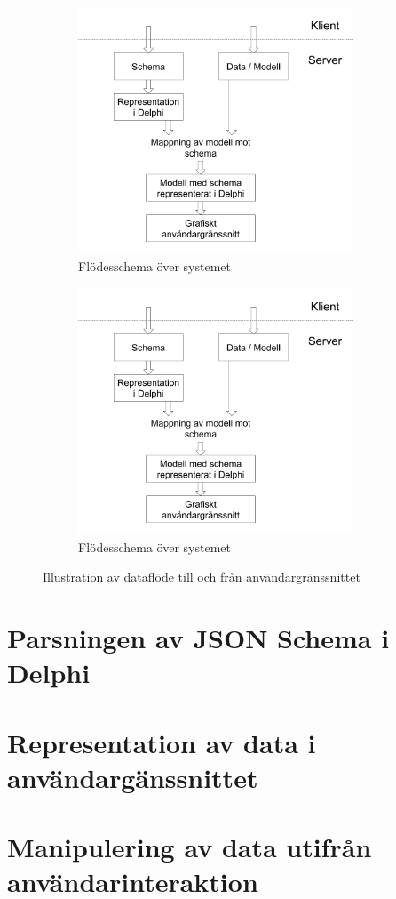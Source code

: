 \begin{figure}
	\begin{subfigure}[b]{0.5\textwidth}
		\includegraphics[width=0.9\textwidth,left]{./img.png}
		\caption{Flödesschema över systemet}
		\label{fig:system:ner}
	\end{subfigure}
	\begin{subfigure}[b]{0.5\textwidth}
		\includegraphics[width=0.9\textwidth,right]{./img.png}
		\caption{Flödesschema över systemet}
		\label{fig:system:upp}	
	\end{subfigure}
	\caption{Illustration av dataflöde till och från användargränssnittet}
	\label{fig:system}
\end{figure}


\section{Parsningen av JSON Schema i Delphi}

\section{Representation av data i användargänssnittet}

\section{Manipulering av data utifrån användarinteraktion}